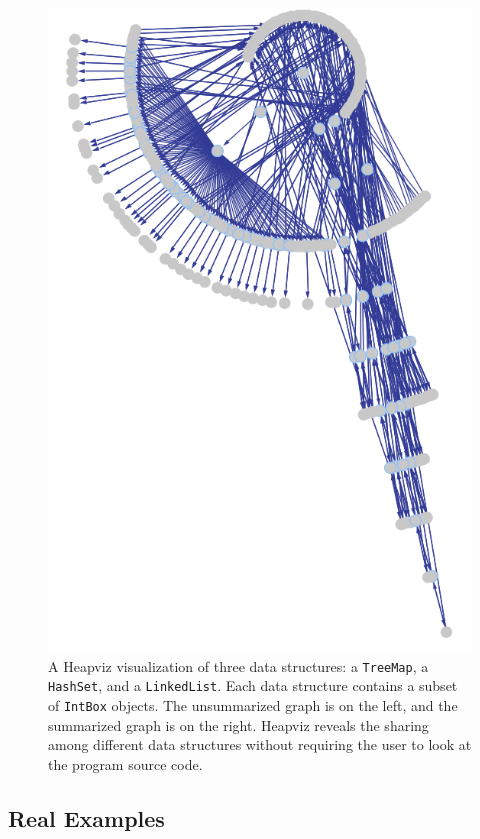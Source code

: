\begin{figure}[t]
  \includegraphics[width=\textwidth]{figs/complicated}
  \caption{A Heapviz visualization of three data structures: a \texttt{TreeMap}, a
\texttt{HashSet}, and a \texttt{LinkedList}.  Each data structure contains a subset of
\texttt{IntBox} objects.  The unsummarized graph is on the left, and the summarized
graph is on the right.  Heapviz reveals the sharing among different data structures 
without requiring the user to look at the program source code.}
  \label{fig:complicated}
\end{figure}

\subsection{Real Examples}

